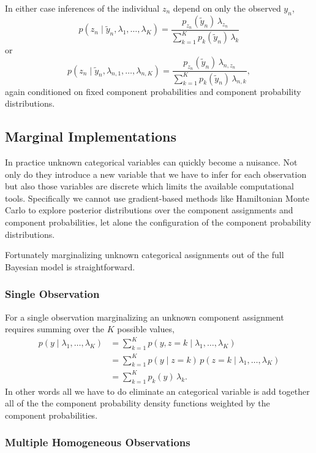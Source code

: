 \documentclass[
  letterpaper,
  DIV=11,
  numbers=noendperiod]{scrartcl}
\begin{document}
In either case inferences of the individual \(z_{n}\) depend on only the
observed \(y_{n}\), \[
p(z_{n} \mid \tilde{y}_{n}, \lambda_{1}, \ldots, \lambda_{K})
=
\frac{ p_{z_{n}}(\tilde{y}_{n}) \, \lambda_{z_{n}}}
{ \sum_{k = 1}^{K} p_{k}(\tilde{y}_{n}) \, \lambda_{k} }
\] or \[
p(z_{n} \mid \tilde{y}_{n}, \lambda_{n, 1}, \ldots, \lambda_{n, K})
=
\frac{ p_{z_{n}}(\tilde{y}_{n}) \, \lambda_{n, z_{n}}}
{ \sum_{k = 1}^{K} p_{k}(\tilde{y}_{n}) \, \lambda_{n, k} },
\] again conditioned on fixed component probabilities and component
probability distributions.

\subsection{Marginal Implementations}\label{marginal-implementations}

In practice unknown categorical variables can quickly become a nuisance.
Not only do they introduce a new variable that we have to infer for each
observation but also those variables are discrete which limits the
available computational tools. Specifically we cannot use gradient-based
methods like Hamiltonian Monte Carlo to explore posterior distributions
over the component assignments and component probabilities, let alone
the configuration of the component probability distributions.

Fortunately marginalizing unknown categorical assignments out of the
full Bayesian model is straightforward.

\subsubsection{Single Observation}\label{single-observation}

For a single observation marginalizing an unknown component assignment
requires summing over the \(K\) possible values, \begin{align*}
p(y \mid \lambda_{1}, \ldots, \lambda_{K})
&=
\sum_{k = 1}^{K}
p(y, z = k \mid \lambda_{1}, \ldots, \lambda_{K})
\\
&=
\sum_{k = 1}^{K}
p(y \mid z = k) \, p(z = k \mid \lambda_{1}, \ldots, \lambda_{K})
\\
&=
\sum_{k = 1}^{K}
p_{k}(y) \, \lambda_{k}.
\end{align*} In other words all we have to do eliminate an categorical
variable is add together all of the the component probability density
functions weighted by the component probabilities.

\subsubsection{Multiple Homogeneous
Observations}\label{multiple-homogeneous-observations}
\end{document}
